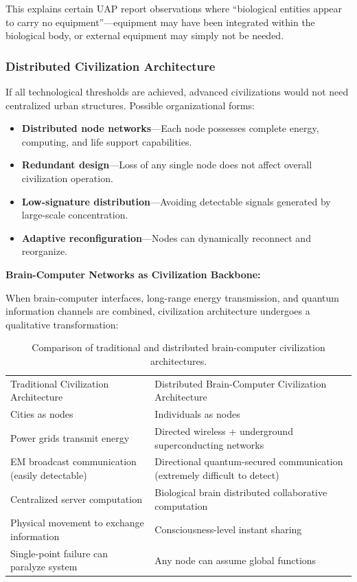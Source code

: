 \documentclass[aps,prd,twocolumn,superscriptaddress,nofootinbib]{revtex4-2}
\begin{document}
This explains certain UAP report observations where ``biological entities appear to carry no equipment''---equipment may have been integrated within the biological body, or external equipment may simply not be needed.

\subsubsection{Distributed Civilization Architecture}\label{sec:distributed-civ}

If all technological thresholds are achieved, advanced civilizations would not need centralized urban structures. Possible organizational forms:

\begin{itemize}
  \item \textbf{Distributed node networks}---Each node possesses complete energy, computing, and life support capabilities.
  \item \textbf{Redundant design}---Loss of any single node does not affect overall civilization operation.
  \item \textbf{Low-signature distribution}---Avoiding detectable signals generated by large-scale concentration.
  \item \textbf{Adaptive reconfiguration}---Nodes can dynamically reconnect and reorganize.
\end{itemize}

\textbf{Brain-Computer Networks as Civilization Backbone:}

When brain-computer interfaces, long-range energy transmission, and quantum information channels are combined, civilization architecture undergoes a qualitative transformation:

\begin{table}[htbp]
\caption{Comparison of traditional and distributed brain-computer civilization architectures.}
\label{tab:civ-architecture}
\begin{ruledtabular}
\begin{tabular}{ll}
Traditional Civilization Architecture & Distributed Brain-Computer Civilization Architecture \\
\colrule
Cities as nodes & Individuals as nodes \\
Power grids transmit energy & Directed wireless + underground superconducting networks \\
EM broadcast communication (easily detectable) & Directional quantum-secured communication (extremely difficult to detect) \\
Centralized server computation & Biological brain distributed collaborative computation \\
Physical movement to exchange information & Consciousness-level instant sharing \\
Single-point failure can paralyze system & Any node can assume global functions \\
\end{tabular}
\end{ruledtabular}
\end{table}
\end{document}
